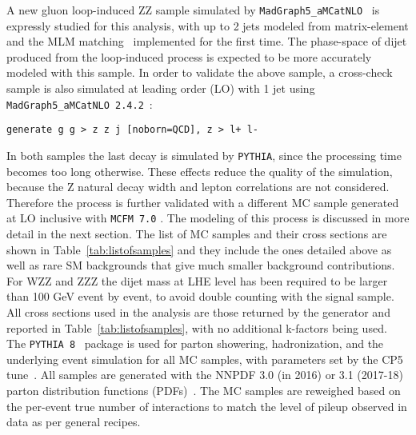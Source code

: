 A new gluon loop-induced ZZ sample simulated by \texttt{MadGraph5\_aMCatNLO}~\cite{MGatNLO} is expressly studied for this analysis, with up to 2 jets modeled from matrix-element and the MLM matching~\cite{MLM} implemented for the first time. The phase-space of dijet produced from the loop-induced process is expected to be more accurately modeled with this sample. %
In order to validate the above sample, a cross-check sample is also simulated at leading order (LO) with 1 jet using \texttt{MadGraph5\_aMCatNLO 2.4.2}~\cite{MGatNLO}:
\begin{verbatim} 
generate g g > z z j [noborn=QCD], z > l+ l- 
\end{verbatim}
In both samples the last decay is simulated by \texttt{PYTHIA}, since the processing time becomes too long otherwise.
These effects reduce the quality of the simulation, because the Z natural decay width and lepton correlations are not considered.
Therefore the process is further validated with a different MC sample generated at LO inclusive with \texttt{MCFM 7.0} \cite{MCFM}.
The modeling of this process is discussed in more detail in
the next section.
The list of MC samples and their cross sections are shown in 
Table~\ref{tab:listofsamples} and they include the ones detailed above as well as rare SM backgrounds that give much smaller background contributions. For WZZ and ZZZ the dijet mass at LHE level has been required to be larger than 100 GeV event by event, to avoid double counting with the signal sample. All cross sections used in the analysis are those returned by the generator and reported in Table~\ref{tab:listofsamples}, with no additional k-factors being used.
The \texttt{PYTHIA 8}~\cite{Sjostrand:2015} package is used for parton showering, hadronization, and the underlying event simulation for all MC samples,
with parameters set by
the CP5 tune~\cite{CP5}. %
All samples are generated with the NNPDF 3.0 (in 2016) or 3.1 (2017-18) parton distribution functions (PDFs)~\cite{NNPDF2015}.
The MC samples are reweighed based on the per-event true number of interactions to match the level of pileup observed in data as per general recipes.

